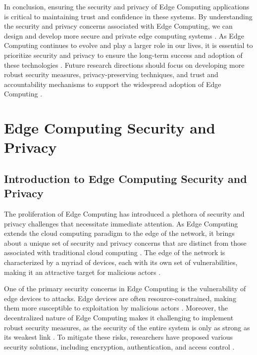 \documentclass[11pt,a4paper]{article}
\begin{document}
In conclusion, ensuring the security and privacy of Edge Computing applications is critical to maintaining trust and confidence in these systems. By understanding the security and privacy concerns associated with Edge Computing, we can design and develop more secure and private edge computing systems \cite{arxiv:2503.06027}. As Edge Computing continues to evolve and play a larger role in our lives, it is essential to prioritize security and privacy to ensure the long-term success and adoption of these technologies \cite{arxiv:2501.02804}. Future research directions should focus on developing more robust security measures, privacy-preserving techniques, and trust and accountability mechanisms to support the widespread adoption of Edge Computing \cite{arxiv:2502.11644}.


\section{Edge Computing Security and Privacy}



\subsection{Introduction to Edge Computing Security and Privacy}


The proliferation of Edge Computing has introduced a plethora of security and privacy challenges that necessitate immediate attention. As Edge Computing extends the cloud computing paradigm to the edge of the network, it brings about a unique set of security and privacy concerns that are distinct from those associated with traditional cloud computing \cite{arxiv:1701.01090}. The edge of the network is characterized by a myriad of devices, each with its own set of vulnerabilities, making it an attractive target for malicious actors \cite{arxiv:1611.05539}.

One of the primary security concerns in Edge Computing is the vulnerability of edge devices to attacks. Edge devices are often resource-constrained, making them more susceptible to exploitation by malicious actors \cite{arxiv:1808.05283}. Moreover, the decentralized nature of Edge Computing makes it challenging to implement robust security measures, as the security of the entire system is only as strong as its weakest link \cite{arxiv:1703.10750}. To mitigate these risks, researchers have proposed various security solutions, including encryption, authentication, and access control \cite{arxiv:2402.13056}.
\end{document}

